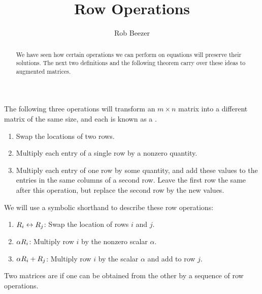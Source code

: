 \documentclass{ximera}
\author{Rob Beezer}
\title{Row Operations}
\begin{document}
\begin{abstract}
  We have seen how certain operations we can perform on equations will
  preserve their solutions.  The next two definitions and the
  following theorem carry over these ideas to augmented matrices.
\end{abstract}
\maketitle


\begin{definition}
The following three operations will transform an $m\times n$ matrix into a different matrix of the same size, and each is known as a .
\begin{enumerate}
\item Swap the locations of two rows.
\item Multiply each entry of a single row by a nonzero quantity.
\item Multiply each entry of one row by some quantity, and add these values to the entries in the same columns of a second row.  Leave the first row the same after this operation, but replace the second row by the new values.
\end{enumerate}
We will use a symbolic shorthand to describe these row operations:
\begin{enumerate}
\item $R_{i}\leftrightarrow R_{j}$: Swap the location of rows $i$ and $j$.
\item $\alpha R_{i}$: Multiply row $i$ by the nonzero scalar $\alpha$.
\item $\alpha R_{i}+R_{j}$: Multiply row $i$ by the scalar $\alpha$ and add to row $j$.
\end{enumerate}
\end{definition}

\begin{definition}
Two matrices are  if one can be obtained from the other by a sequence of row operations.
\end{definition}
\end{document}
